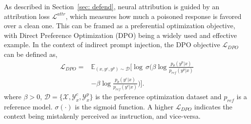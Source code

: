 As described in Section~\ref{sec: defend}, neural attribution is guided by an attribution loss $\mathcal L^{attr}$, which measures how much a poisoned response is favored over a clean one. 
This can be framed as a preferential optimization objective, with Direct Preference Optimization (DPO) \cite{rafailov2024direct} being a widely used and effective example.
In the context of indirect prompt injection, the DPO objective $\mathcal L_{DPO}$ can be defined as,
%
\begin{equation}
  \begin{split} \label{eq:L_dpo_}
    \!\! \mathcal L_{DPO} = &\mathbb  E_{(x,y^c,y^p)\sim \mathcal D} [ \log \,\sigma( \beta\log \frac{p_{\theta}(y^p|x)}{p_{ref}(y^p|x)} \\
    &-\beta\log \frac{p_{\theta}(y^c|x)}{p_{ref}(y^c|x)})].
  \end{split}
\end{equation}
%
where $\beta>0$, $\mathcal D=\{\mathcal X, \mathcal Y^c_x, \mathcal Y^p_x\}$ is the perference optimization dataset and $p_{ref}$ is a reference model. $\sigma(\cdot)$ is the sigmoid function.
A higher $\mathcal L_{DPO}$ indicates the context being mistakenly perceived as instruction, and vice-versa.

